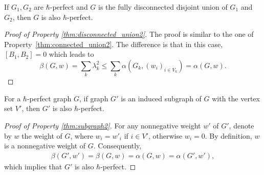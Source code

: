 \begin{prop}
\label{thm:disconnected_union2}
If $G_1, G_2$ are $\hbar$-perfect and $G$ is the fully disconnected disjoint union of $G_1$ and $G_2$, then $G$ is also $\hbar$-perfect.
\end{prop}
\begin{proof}[Proof of Property \ref{thm:disconnected_union2}]
The proof is similar to the one of Property~\ref{thm:connected_union2}. The difference is that in this case, $ [B_1,B_2] =0$ which leads to 
    \begin{equation}
        \beta(G,w) = \sum_k \lambda_k^2 \le \sum_k \alpha(G_k, (w_i)_{i\in V_k}) = \alpha(G,w).
    \end{equation} 
\end{proof}

\begin{prop}
\label{thm:subgraph2}
    For a $\hbar$-perfect graph $G$, if graph $G'$ is an induced subgraph of $G$ with the vertex set $V'$, then $G'$ is also $\hbar$-perfect.
\end{prop}
\begin{proof}[Proof of Property \ref{thm:subgraph2}] 
    For any nonnegative weight $w'$ of $G'$, denote by $w$ the weight of $G$, where $w_i = w'_i$ if $i \in V'$, otherwise $w_i = 0$. By definition, $w$ is a nonnegative weight of $G$. Consequently,
    \begin{align}
        \beta(G',w') = \beta(G,w) = \alpha(G,w) = \alpha(G',w'),
    \end{align}
    which implies that $G'$ is also $\hbar$-perfect.
\end{proof}

